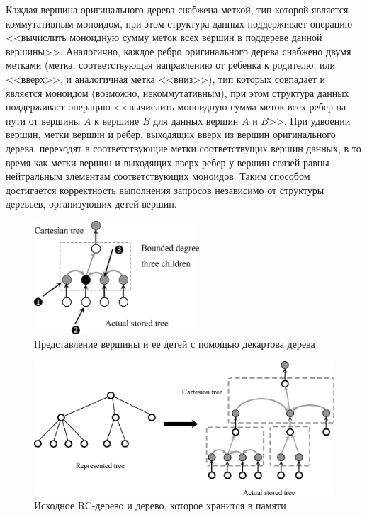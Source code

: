 \documentclass[specification,annotation]{itmo-student-thesis}
\begin{document}
Каждая вершина оригинального дерева снабжена меткой, тип которой является коммутативным моноидом, при этом структура данных поддерживает операцию <<вычислить моноидную сумму меток всех вершин в поддереве
данной вершины>>. Аналогично, каждое ребро оригинального дерева снабжено двумя метками (метка, соответствующая направлению от ребенка к родителю, или <<вверх>>, и аналогичная метка <<вниз>>),
тип которых совпадает и является моноидом (возможно, некоммутативным), при этом структура данных поддерживает операцию <<вычислить моноидную сумма меток всех ребер на пути от вершины $A$
к вершине $B$ для данных вершин $A$ и $B$>>. При удвоении вершин, метки вершин и ребер, выходящих вверх из вершин оригинального дерева, переходят в соответствующие метки соответствущих вершин данных,
в то время как метки вершин и выходящих вверх ребер у вершин связей равны нейтральным элементам соответствующих моноидов. Таким способом достигается корректность выполнения запросов независимо от
структуры деревьев, организующих детей вершин.

\begin{figure}[!ht]
\centering
\includegraphics[width=0.55\textwidth]{pic/Cartesian_tree.png}
\caption{Представление вершины и ее детей с помощью декартова дерева}\label{fig:cartesian-children}
\end{figure}

\begin{figure}[!ht]
\centering
\includegraphics[width=1.0\textwidth]{pic/represented_tree_and_actual_stored_tree.png}
\caption{Исходное RC-дерево и дерево, которое хранится в памяти}\label{fig:represented}
\end{figure}
\end{document}

